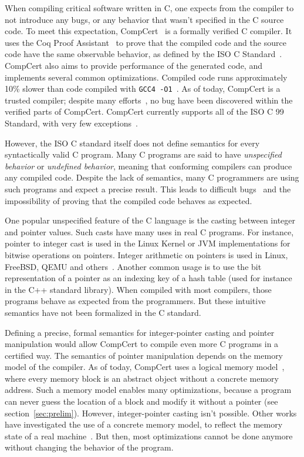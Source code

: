 When compiling critical software written in C, one expects from the compiler to not introduce any bugs, or any behavior that wasn't specified in the C source code.%
To meet this expectation, CompCert~\cite{DBLP:journals/cacm/Leroy09} is a formally verified C compiler.
It uses the Coq Proof Assistant~\cite{coq} to prove that the compiled code and the source code have the same observable behavior, as defined by the ISO C Standard~\cite{iso}.
CompCert also aims to provide performance of the generated code, and implements several common optimizations. Compiled code runs approximately 10\% slower than code compiled with \texttt{GCC4 -O1}~\cite{compcertwebsite}.
As of today, CompCert is a trusted compiler; despite many efforts~\cite{DBLP:conf/pldi/YangCER11}, no bug have been discovered within the verified parts of CompCert.
CompCert currently supports all of the ISO C 99 Standard, with very few exceptions~\cite{compcertwebsite}.

However, the ISO C standard itself does not define semantics for every syntactically valid C program.
Many C programs are said to have \textit{unspecified behavior} or \textit{undefined behavior}, meaning that conforming compilers can produce any compiled code.
Despite the lack of semantics, many C programmers are using such programs and expect a precise result. %
This leads to difficult bugs~\cite{DBLP:conf/apsys/WangCCJZK12} and the impossibility of proving that the compiled code behaves as expected.

One popular unspecified feature of the C language is the casting between integer and pointer values.
Such casts have many uses in real C programs. For instance, pointer to integer cast is used in the Linux Kernel or JVM implementations for bitwise operations on pointers. Integer arithmetic on pointers is used in Linux, FreeBSD, QEMU and others~\cite{cerberus}. Another common usage is to use the bit representation of a pointer as an indexing key of a hash table (used for instance in the C++ standard library).
When compiled with most compilers, those programs behave as expected from the programmers. But these intuitive semantics have not been formalized in the C standard.

Defining a precise, formal semantics for integer-pointer casting and pointer manipulation would allow CompCert to compile even more C programs in a certified way.
The semantics of pointer manipulation depends on the memory model of the compiler.
As of today, CompCert uses a logical memory model~\cite{leroy:hal-00703441}, where every memory block is an abstract object without a concrete memory address. Such a memory model enables many optimizations, because a program can never guess the location of a block and modify it without a pointer (see section~\ref{sec:prelim}).
However, integer-pointer casting isn't possible.
Other works have investigated the use of a concrete memory model, to reflect the memory state of a real machine~\cite{DBLP:conf/popl/TuchKN07}\cite{Norrish98cformalised}. But then, most optimizations cannot be done anymore without changing the behavior of the program.

